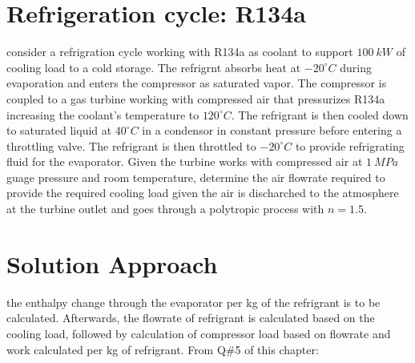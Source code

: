 \documentclass[letterpaper,10pt,english]{jupyterBook}
\begin{document}
\section{Refrigeration cycle: R134a}
\label{\detokenize{notebooks/Chapter5/CH5-Q6:refrigeration-cycle-r134a}}\label{\detokenize{notebooks/Chapter5/CH5-Q6::doc}}
\sphinxAtStartPar
consider a refrigration cycle working with R134\sphinxhyphen{}a as coolant to support \(100\:kW\) of cooling load to a cold storage. The refrigrnt absorbs heat at \(-20^{\circ}  C\) during evaporation and enters the compressor as saturated vapor. The compressor is coupled to a gas turbine working with compressed air that pressurizes R134\sphinxhyphen{}a increasing the coolant’s temperature to \(120^{\circ}  C\). The refrigrant is then cooled down to saturated liquid at \(40^{\circ}  C\) in a condensor in constant pressure before entering a throttling valve. The refrigrant is then throttled to \(-20^{\circ}  C\) to provide refrigrating fluid for the evaporator. Given the turbine works with compressed air at \(1\:MPa\) guage pressure and room temperature, determine the air flow\sphinxhyphen{}rate required to provide the required cooling load given the air is discharched to the atmosphere at the turbine outlet and goes through a polytropic process with \(n=1.5\).

\sphinxAtStartPar
{}


\section{Solution Approach}
\label{\detokenize{notebooks/Chapter5/CH5-Q6:solution-approach}}
\sphinxAtStartPar
the enthalpy change through the evaporator per kg of the refrigrant is to be calculated. Afterwards, the flow\sphinxhyphen{}rate of refrigrant is calculated based on the cooling load, followed by calculation of compressor load based on flow\sphinxhyphen{}rate and work calculated per kg of refrigrant. From Q\#5 of this chapter:
\end{document}
